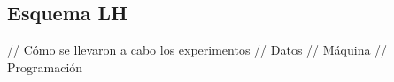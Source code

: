 \subsection{Esquema LH}





// Cómo se llevaron a cabo los experimentos
// Datos
// Máquina
// Programación 

